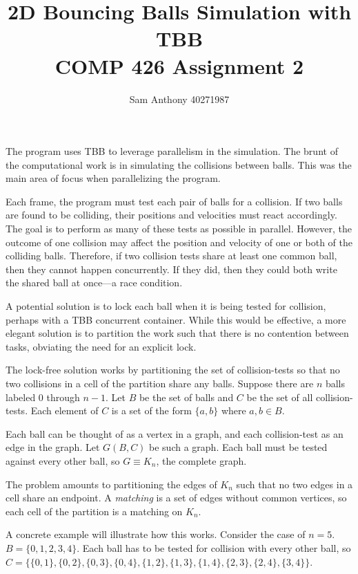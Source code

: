 \documentclass[11pt]{article}
\title{2D Bouncing Balls Simulation with TBB\\
\large COMP 426 Assignment 2}
\author{Sam Anthony 40271987}
\begin{document}
\maketitle

The program uses TBB to leverage parallelism in the simulation.
The brunt of the computational work is in simulating the collisions between balls.
This was the main area of focus when parallelizing the program.

Each frame, the program must test each pair of balls for a collision.
If two balls are found to be colliding, their positions and velocities must react accordingly.
The goal is to perform as many of these tests as possible in parallel.
However, the outcome of one collision may affect the position and velocity of one or both of the colliding balls.
Therefore, if two collision tests share at least one common ball, then they cannot happen concurrently.
If they did, then they could both write the shared ball at once---a race condition.

A potential solution is to lock each ball when it is being tested for collision, perhaps with a TBB concurrent container.
While this would be effective, a more elegant solution is to partition the work such that there is no contention between tasks, obviating the need for an explicit lock.

The lock-free solution works by partitioning the set of collision-tests so that no two collisions in a cell of the partition share any balls.
Suppose there are $n$ balls labeled 0 through $n-1$.
Let $B$ be the set of balls and $C$ be the set of all collision-tests.
Each element of $C$ is a set of the form $\{a, b\}$ where $a,b \in B$.

Each ball can be thought of as a vertex in a graph, and each collision-test as an edge in the graph.
Let $G(B, C)$ be such a graph.
Each ball must be tested against every other ball, so $G \equiv K_n$, the complete graph.

The problem amounts to partitioning the edges of $K_n$ such that no two edges in a cell share an endpoint.
A \emph{matching} is a set of edges without common vertices, so each cell of the partition is a matching on $K_n$.

A concrete example will illustrate how this works.
Consider the case of $n = 5$.
$B = \{0, 1, 2, 3, 4\}$.
Each ball has to be tested for collision with every other ball, so $C = \{\{0, 1\}, \{0, 2\}, \{0, 3\}, \{0, 4\}, \{1, 2\}, \{1, 3\}, \{1, 4\}, \{2, 3\}, \{2, 4\}, \{3, 4\}\}$.
\end{document}
